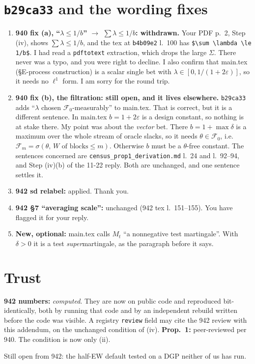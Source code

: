 \documentclass[11pt]{article}
\begin{document}
\section{\texttt{b29ca33} and the wording fixes}
\begin{enumerate}[nosep,label=(\roman*)]
\item \textbf{940 fix (a), ``$\lambda\le1/b$'' $\to$ $\sum\lambda\le1/b$: withdrawn.} Your PDF p.~2, Step (iv), shows $\sum\lambda\le1/b$, and the tex at \texttt{b4b09e2} l.~100 has \verb|$\sum \lambda \le 1/b$|. I had read a \texttt{pdftotext} extraction, which drops the large $\Sigma$. There never was a typo, and you were right to decline. I also confirm that main.tex (\S E-process construction) is a scalar single bet with $\lambda\in[0,1/(1+2\varepsilon)]$, so it needs no $\ell^1$ form. I am sorry for the round trip.
\item \textbf{940 fix (b), the filtration: still open, and it lives elsewhere.} \texttt{b29ca33} adds ``$\lambda$ chosen $\mathcal F_0$-measurably'' to main.tex. That is correct, but it is a different sentence. In main.tex $b=1+2\varepsilon$ is a design constant, so nothing is at stake there. My point was about the \emph{vector} bet. There $b=1+\max\delta$ is a maximum over the whole stream of oracle slacks, so it needs $\theta\in\mathcal F_0$, i.e.\ $\mathcal F_m=\sigma(\theta,\,W\text{ of blocks}\le m)$. Otherwise $b$ must be a $\theta$-free constant. The sentences concerned are \texttt{census\_prop1\_derivation.md} l.~24 and l.~92--94, and Step (iv)(b) of the 11-22 reply. Both are unchanged, and one sentence settles it.
\item \textbf{942 sd relabel:} applied. Thank you.
\item \textbf{942 \S7 ``averaging scale'':} unchanged (942 tex l.~151--155). You have flagged it for your reply.
\item \textbf{New, optional:} main.tex calls $M_t$ ``a nonnegative test martingale''. With $\delta>0$ it is a test \emph{super}martingale, as the paragraph before it says.
\end{enumerate}

\section{Trust}
\textbf{942 numbers:} \emph{computed}. They are now on public code and reproduced bit-identically, both by running that code and by an independent rebuild written before the code was visible. A registry \texttt{review} field may cite the 942 review with this addendum, on the unchanged condition of (iv).
\textbf{Prop.~1:} peer-reviewed per 940. The condition is now only (ii).

Still open from 942: the half-EW default tested on a DGP neither of us has run.
\end{document}
